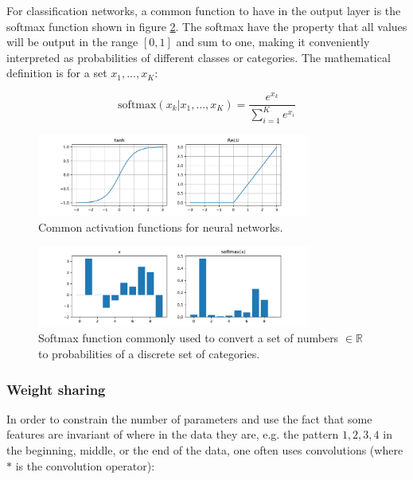 For classification networks, a common function to have in the output layer is
the softmax function shown in figure \ref{fig:softmax}. The softmax have the
property that all values will be output in the range $[0, 1]$ and sum to one,
making it conveniently interpreted as probabilities of different classes or
categories. The mathematical definition is for a set $x_1, ..., x_K$:

\begin{equation}
    \text{softmax}(x_k|x_1, ..., x_K) = \frac{e^{x_k}}{\sum_{i=1}^K e^{x_i}}
\end{equation}

\begin{figure}[h]
    \centering
    \includegraphics[width=0.8\textwidth]{res/relu_tanh.pdf}

    \caption{Common activation functions for neural networks.}

    \label{fig:tanh_relu}
\end{figure}

\begin{figure}[h]
    \centering
    \includegraphics[width=0.8\textwidth]{res/softmax.pdf}

    \caption{Softmax function commonly used to convert a set of numbers $\in \mathbb{R}$ to probabilities of a discrete set of categories.}

    \label{fig:softmax}
\end{figure}

\subsubsection{Weight sharing}

In order to constrain the number of parameters and use the fact that some
features are invariant of where in the data they are, e.g. the pattern $1, 2,
3, 4$ in the beginning, middle, or the end of the data, one often uses
convolutions (where $*$ is the convolution operator):

